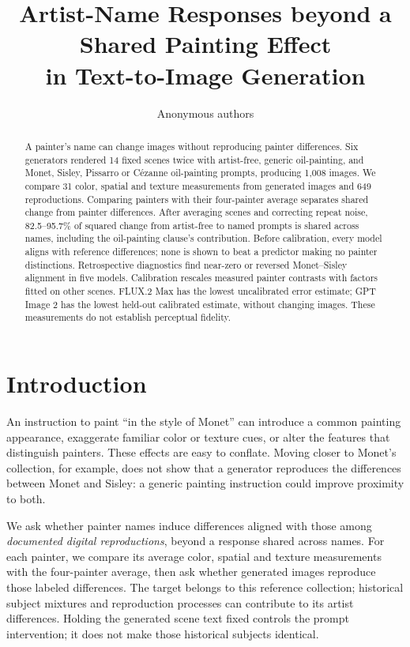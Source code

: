 \documentclass[11pt]{article}
\title{Artist-Name Responses beyond a Shared Painting Effect\\in Text-to-Image Generation}
\author{Anonymous authors}
\date{}
\begin{document}
\maketitle

\begin{abstract}
A painter's name can change images without reproducing painter differences.
Six generators rendered 14 fixed scenes twice with artist-free, generic
oil-painting, and Monet, Sisley, Pissarro or C\'ezanne oil-painting prompts,
producing 1,008 images. We compare 31 color, spatial and texture measurements
from generated images and 649 reproductions. Comparing painters with their
four-painter average separates shared change from painter differences. After averaging scenes
and correcting repeat noise, 82.5--95.7\% of squared change from artist-free
to named prompts is shared across names, including the oil-painting clause's
contribution. Before calibration, every model aligns with reference
differences; none is shown to beat a predictor making no painter
distinctions. Retrospective diagnostics find near-zero or reversed
Monet--Sisley alignment in five models. Calibration rescales measured painter contrasts
with factors fitted on other scenes. FLUX.2 Max has the lowest
uncalibrated error estimate; GPT Image 2 has the lowest held-out calibrated
estimate, without changing images. These measurements do not establish perceptual fidelity.
\end{abstract}

\section{Introduction}
An instruction to paint ``in the style of Monet'' can introduce a common
painting appearance, exaggerate familiar color or texture cues, or alter the
features that distinguish painters. These effects are easy to
conflate. Moving closer to Monet's collection, for example, does not show that
a generator reproduces the differences between Monet and Sisley: a generic
painting instruction could improve proximity to both.

We ask whether painter names induce differences aligned with those among
\emph{documented digital reproductions}, beyond a response shared across names.
For each painter, we compare its average color, spatial and texture measurements
with the four-painter average, then ask whether generated images reproduce
those labeled differences. The target belongs to this reference collection;
historical subject
mixtures and reproduction processes can contribute to its artist differences.
Holding the generated scene text fixed controls the prompt intervention; it
does not make those historical subjects identical.
\end{document}
